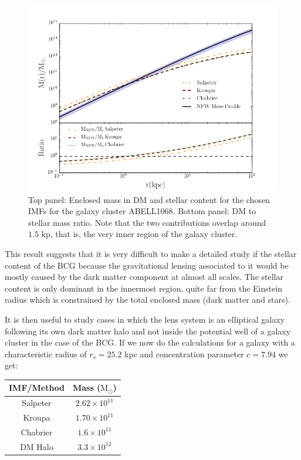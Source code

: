 \begin{figure}[H]
\centering
\includegraphics[width=12cm]{images/DM_fraction_all_IMFs.png}
\caption[Enclosed mass and DM to stellar mass ratio for a galaxy cluster]{Top panel: Enclosed mass in DM and stellar content for the chosen IMFs for the galaxy cluster ABELL1068. Bottom panel: DM to stellar mass ratio. Note that the two contributions overlap around $1.5 $ kp, that is, the very inner region of the galaxy cluster.}
\end{figure}

This result suggests that it is very difficult to make a detailed study if the stellar content of the BCG because the gravitational lensing associated to it would be mostly caused by the dark matter component at almost all scales. The stellar content is only dominant in the innermost region, quite far from the Einstein radius which is constrained by the total enclosed mass (dark matter and stars).

It is then useful to study cases in which the lens system is an elliptical galaxy following its own dark matter halo and not inside the potential well of a galaxy cluster in the case of the BCG. If we now do the calculations for a galaxy with a characteristic radius of $r_s=25.2$ kpc and concentration parameter $c=7.94$ we get:

\begin{center}
\begin{tabular}{c c}
IMF/Method & Mass ($\text{M}_{\odot}$)\tabularnewline
\hline 
\hline
Salpeter & $2.62\times10^{11}$\tabularnewline
Kroupa & $1.70\times10^{11}$\tabularnewline
Chabrier & $1.6\times10^{11}$\tabularnewline
DM Halo & $3.3\times10^{12}$\tabularnewline
\end{tabular}
\end{center}


